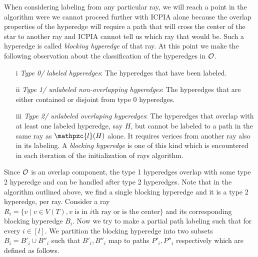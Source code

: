 \documentclass{fsttcs}
\def\cO{{\cal O}}
\def\cl{\mathpzc{l}}
\begin{document}
\noindent
When considering labeling from any
particular ray, we will reach a point in the algorithm were we cannot
proceed further with ICPIA alone because the overlap properties of the
hyperedge will require a path that will cross the center of the star
to another ray and ICPIA cannot tell us which ray that would be. Such
a hyperedge is called {\em blocking hyperedge} of that ray. At this
point we make the following observation about the classification of
the hyperedges in $\cO$.
\begin{itemize}
\item[i] {\em Type 0/ labeled hyperedges}: The hyperedges that have been labeled.
\item[ii] {\em Type 1/ unlabeled non-overlapping hyperedges}: The hyperedges that are either contained or
  disjoint from type 0 hyperedges.
\item[iii] {\em Type 2/ unlabeled overlaping hyperedges}: The hyperedges that overlap with at least one
  labeled hyperedge, say $H$, but cannot be labeled to a path in the
  same ray as $\cl(H)$ alone. It requires verices from another ray
  also in its labeling. A {\em blocking hyperedge} is one of this kind
  which is encountered in each iteration of the initialization of rays algorithm.
\end{itemize}
\noindent
Since $\cO$ is an overlap component, the type 1 hyperedges overlap
with some type 2 hyperedge and can be handled after type 2
hyperedges. Note that in the algorithm outlined above, we find a single
blocking hyperedge and it is a type 2 hyperedge, per ray. Consider a
ray $R_i = \{v \mid v \in V(T), v \text{ is in $i$th ray or is the center}\}$ and its
corresponding blocking hyperedge $B_i$. Now we try
to make a partial path labeling such that for every $i \in [l]$. We partition the blocking
hyperedge into two subsets $B_i = B'_i \cup B''_i$ such that $B'_i,
B''_i$ map to paths $P'_i, P''_i$ respectively which are defined as
follows. 
\end{document}
